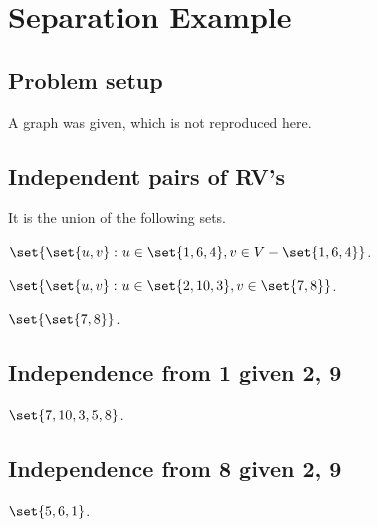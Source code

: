 \documentclass{article}
\begin{document}
\section{Separation Example}
\subsection{Problem setup}
A graph was given, which is not reproduced here.

\subsection{Independent pairs of RV's}
It is the union of the following sets.

$\set{\set{u, v}: u \in \set{1, 6, 4}, v \in V - \set{1, 6, 4}}$.

$\set{\set{u, v}: u \in \set{2, 10, 3}, v \in \set{7, 8}}$.

$\set{\set{7, 8}}$.

\subsection{Independence from 1 given 2, 9}
$\set{7, 10, 3, 5, 8}$.

\subsection{Independence from 8 given 2, 9}
$\set{5, 6, 1}$.
\end{document}
